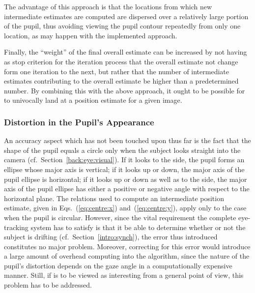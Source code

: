 The advantage of this approach is that the locations from which new
intermediate estimates are computed are dispersed over a relatively
large portion of the pupil, thus avoiding viewing the pupil contour
repeatedly from only one location, as may happen with the implemented
approach.

Finally, the ``weight'' of the final overall estimate can be increased
by not having as stop criterion for the iteration process that the
overall estimate not change form one iteration to the next, but rather
that the number of intermediate estimates contributing to the overall
estimate be higher than a predetermined number.  By combining this
with the above approach, it ought to be possible for {\octopus} to
univocally land at a position estimate for a given image.


\subsubsection{Distortion in the Pupil's Appearance}

An accuracy aspect which has not been touched upon thus far is the
fact that the shape of the pupil equals a circle only when the subject
looks straight into the camera (cf.\ Section~\ref{back:eye:visual}).
If it looks to the side, the pupil forms an ellipse whose major axis
is vertical; if it looks up or down, the major axis of the pupil
ellipse is horizontal; if it looks up or down as well as to the side,
the major axis of the pupil ellipse has either a positive or negative
angle with respect to the horizontal plane.  The relations used to
compute an intermediate position estimate, given in
Eqs.~(\ref{eq:centre:x}) and~(\ref{eq:centre:y}), apply only to the
case when the pupil is circular.  However, since the vital requirement
the complete eye-tracking system has to satisfy is that it be able to
determine whether or not the subject is drifting (cf.\ 
Section~\ref{intro:synch}), the error thus introduced constitutes no
major problem.  Moreover, correcting for this error would introduce a
large amount of overhead computing into the algorithm, since the
nature of the pupil's distortion depends on the gaze angle in a
computationally expensive manner.  Still, if {\octopus} is to be
viewed as interesting from a general point of view, this problem has
to be addressed.

